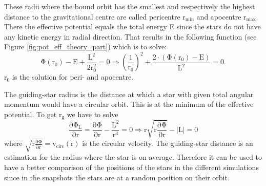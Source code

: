 \par These radii where the bound orbit has the smallest and respectively the highest distance to the gravitational centre are called pericentre \(\mathrm{r_{min}}\)  and apocentre \(\mathrm{r_{max}}\).  There the effective potential equals the total energy E since the stars do not have any kinetic energy in radial direction. That results in the following function (see Figure \ref{fig:pot_eff_theory_part}) which is to solve: 
\begin{equation}\label{eq:root_pot_eff}
\mathrm {\Phi(r_0)-E +\frac{L^2}{2r_0^2}=0\Rightarrow\left(\frac{1}{r_0}\right)^2+\frac{2\cdot (\Phi(r_0)-E)}{L^2}=0.}
\end{equation}
r\(_0\) is the solution for peri- and apocentre.
\par The guiding-star radius is the distance at which a star with given total angular momentum would have a circular orbit. This is at the minimum of the effective potential. To get \(\mathrm{r_g}\) we have to solve
\begin{equation}\label{eq:min_pot_eff}
\mathrm{\frac{\partial\Phi_L}{\partial r}=\frac{\partial\Phi}{\partial r}-\frac{L^2}{r^3}=0\Rightarrow r\sqrt{r\frac{\partial\Phi}{\partial r}}-|L|=0}
\end{equation} where \(\mathrm{\sqrt{r\frac{\partial\Phi}{\partial r}}=v_{circ}(r)}\) is the circular velocity. The guiding-star distance is an estimation for the radius where the star is on average. Therefore it can be used to have a better comparison of the positions of the stars in the different simulations since in the snapshots the stars are at a random position on their orbit.

